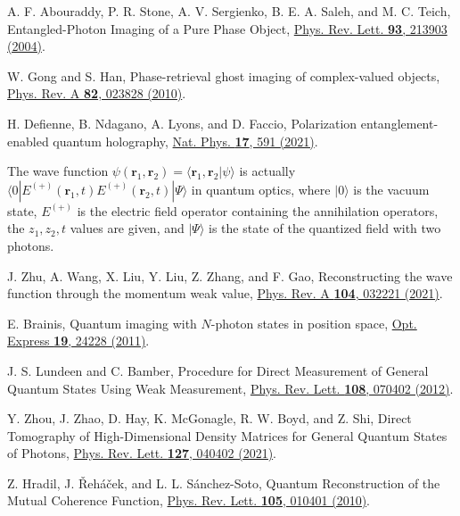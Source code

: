 \documentclass[pra,english,reprint,nofootinbib,aps,superscriptaddress,showpacs,showkeys]{revtex4-2}
\theoremstyle{definition}
\theoremstyle{remark}
\begin{document}
\begin{thebibliography}{99}
		A. F. Abouraddy, P. R. Stone, A. V. Sergienko, B. E. A. Saleh, and M. C. Teich,
		Entangled-Photon Imaging of a Pure Phase Object,
		\href{https://doi.org/10.1103/PhysRevLett.93.213903}{Phys. Rev. Lett. \textbf{93}, 213903 (2004)}.
		
		W. Gong and S. Han,
		Phase-retrieval ghost imaging of complex-valued objects,
		\href{https://doi.org/10.1103/PhysRevA.82.023828}{Phys. Rev. A \textbf{82}, 023828 (2010)}.
		
		H. Defienne, B. Ndagano, A. Lyons, and D. Faccio,
		Polarization entanglement-enabled quantum holography,
		\href{https://doi.org/10.1038/s41567-020-01156-1}{Nat. Phys. \textbf{17}, 591 (2021)}.
		
		The wave function $\psi(\mathbf{r}_1,\mathbf{r}_2)=\langle\mathbf{r}_1,\mathbf{r}_2|\psi\rangle$ is actually $\langle0|E^{(+)}(\mathbf{r}_1,t)E^{(+)}(\mathbf{r}_2,t)|\varPsi\rangle$ in quantum optics, where $|0\rangle$ is the vacuum state, $E^{(+)}$ is the electric field operator containing the annihilation operators, the $z_1,z_2,t$ values are given, and $|\varPsi\rangle$ is the state of the quantized field with two photons.
		
		J. Zhu, A. Wang, X. Liu, Y. Liu, Z. Zhang, and F. Gao,
		Reconstructing the wave function through the momentum weak value,
		\href{https://doi.org/10.1103/PhysRevA.104.032221}{Phys. Rev. A \textbf{104}, 032221 (2021)}.
		
		E. Brainis,
		Quantum imaging with $N$-photon states in position space,
		\href{https://doi.org/10.1364/OE.19.024228}{Opt. Express \textbf{19}, 24228 (2011)}.
		
		J. S. Lundeen and C. Bamber,
		Procedure for Direct Measurement of General Quantum States Using Weak Measurement,
		\href{https://doi.org/10.1103/PhysRevLett.108.070402}{Phys. Rev. Lett. \textbf{108}, 070402 (2012)}.
		
		Y. Zhou, J. Zhao, D. Hay, K. McGonagle, R. W. Boyd, and Z. Shi,
		Direct Tomography of High-Dimensional Density Matrices for General Quantum States of Photons,
		\href{https://doi.org/10.1103/PhysRevLett.127.040402}{Phys. Rev. Lett. \textbf{127}, 040402 (2021)}.
		
		Z. Hradil, J. \v{R}eh\'{a}\v{c}ek, and L. L. S\'{a}nchez-Soto,
		Quantum Reconstruction of the Mutual Coherence Function,
		\href{https://doi.org/10.1103/PhysRevLett.105.010401}{Phys. Rev. Lett. \textbf{105}, 010401 (2010)}.
		

\end{thebibliography}
\end{document}
